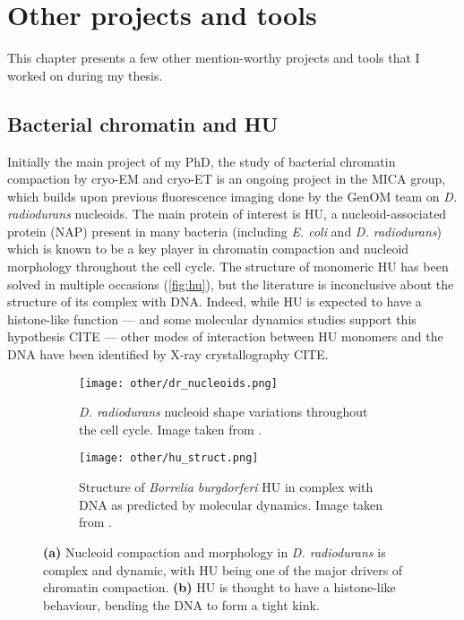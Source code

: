 \chapter{Other projects and tools}\label{other_projects}

This chapter presents a few other mention-worthy projects and tools that I worked on during my thesis.

\localtableofcontents

\section{Bacterial chromatin and HU}

Initially the main project of my PhD, the study of bacterial chromatin compaction by cryo-EM and cryo-ET is an ongoing project in the MICA group, which builds upon previous fluorescence imaging done by the GenOM team on \textit{D. radiodurans} nucleoids.
The main protein of interest is HU, a nucleoid-associated protein (NAP) present in many bacteria (including \textit{E. coli} and \textit{D. radiodurans}) which is known to be a key player in chromatin compaction and nucleoid morphology throughout the cell cycle.
The structure of monomeric HU has been solved in multiple occasions (\autoref{fig:hu}), but the literature is inconclusive about the structure of its complex with DNA.
Indeed, while HU is expected to have a histone-like function --- and some molecular dynamics studies support this hypothesis CITE --- other modes of interaction between HU monomers and the DNA have been identified by X-ray crystallography CITE.

\begin{figure}[ht]
    \centering
    \begin{subfigure}[B]{.48\textwidth}
        \centering
        \texttt{[image: other/dr\_nucleoids.png]}
        \caption{\textit{D. radiodurans} nucleoid shape variations throughout the cell cycle. Image taken from \citet{flochCellMorphologyNucleoid2019}.}
        \label{fig:hu_nucleoids}
    \end{subfigure}%
    \hfill
    \begin{subfigure}[B]{.5\textwidth}
        \centering
        \texttt{[image: other/hu\_struct.png]}
        \caption{Structure of \textit{Borrelia burgdorferi} HU in complex with DNA as predicted by molecular dynamics. Image taken from \citet{hognonMolecularBasesDNA2019}.}
        \label{fig:hu_structure}
    \end{subfigure}%
    \caption[\textit{D. radiodurans} nucleoids and HU structure]{\textbf{(a)} Nucleoid compaction and morphology in \textit{D. radiodurans} is complex and dynamic, with HU being one of the major drivers of chromatin compaction. \textbf{(b)} HU is thought to have a histone-like behaviour, bending the DNA to form a tight kink.}
    \label{fig:hu}
\end{figure}

